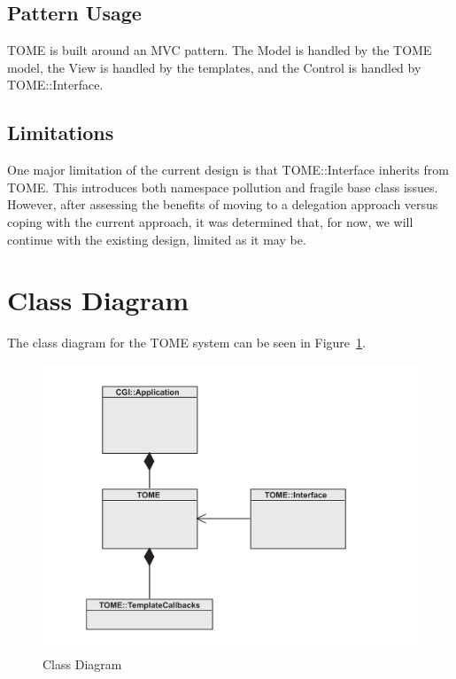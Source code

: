 \documentclass[12pt,titlepage]{article}
\begin{document}
\subsection{Pattern Usage}
TOME is built around an MVC pattern.  The Model is handled by the TOME model, the View is handled by the templates, and the Control is handled by TOME::Interface.
\subsection{Limitations}
One major limitation of the current design is that TOME::Interface inherits from TOME.  This introduces both namespace pollution and fragile base class issues.  However, after assessing the benefits of moving to a delegation approach versus coping with the current approach, it was determined that, for now, we will continue with the existing design, limited as it may be.


\section{Class Diagram}
The class diagram for the TOME system can be seen in Figure~\ref{ComponentDiagram}.
\begin{figure}[h]
	\includegraphics[width=\textwidth]{ComponentDiagram}
	\caption{Class Diagram}
	\label{ComponentDiagram}
\end{figure}
\end{document}
